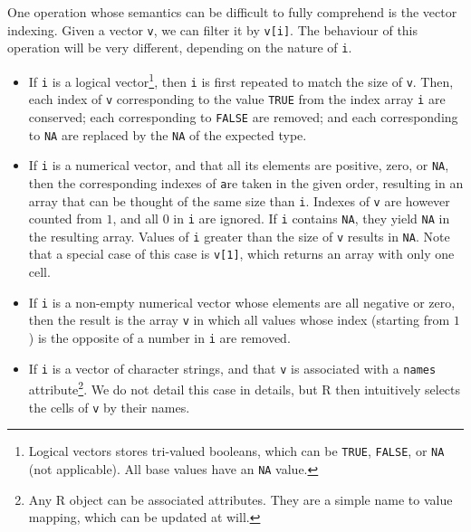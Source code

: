 \documentclass{article}
\newcommand\R{R}
\begin{document}
One operation whose semantics can be difficult
to fully comprehend is the vector indexing.
Given a vector \texttt{v},
we can filter it by \texttt{v[i]}.
The behaviour of this operation will be very different,
depending on the nature of \texttt{i}.
\begin{itemize}
    \item If \texttt{i} is a logical vector\footnote{
          Logical vectors stores tri-valued booleans,
          which can be \texttt{TRUE}, \texttt{FALSE},
          or \texttt{NA} (not applicable).
          All base values have an \texttt{NA} value.
      }, then \texttt{i} is first repeated
      to match the size of \texttt{v}.
      Then, each index of \texttt{v} corresponding
      to the value \texttt{TRUE} from the index array \texttt{i}
      are conserved;
      each corresponding to \texttt{FALSE} are removed;
      and each corresponding to \texttt{NA} are replaced
      by the \texttt{NA} of the expected type.
    \item If \texttt{i} is a numerical vector,
      and that all its elements are positive, zero, or \texttt{NA},
      then the corresponding indexes of \texttt
      are taken in the given order, resulting in an array
      that can be thought of the same size than \texttt{i}.
      Indexes of \texttt{v} are however counted from
      \(1\), and all \(0\) in \texttt{i} are ignored.
      If \texttt{i} contains \texttt{NA},
      they yield \texttt{NA} in the resulting array.
      Values of \texttt{i} greater than the size of \texttt{v}
      results in \texttt{NA}.
      Note that a special case of this case is \texttt{v[1]},
      which returns an array with only one cell.
    \item If \texttt{i} is a non-empty numerical vector
      whose elements are all negative or zero,
      then the result is the array \texttt{v}
      in which all values whose index (starting from \(1\))
      is the opposite of a number in \texttt{i} are removed.
    \item If \texttt{i} is a vector of character strings,
      and that \texttt{v} is associated with a \texttt{names}
      attribute\footnote{
          Any \R{} object can be associated attributes.
          They are a simple name to value mapping,
          which can be updated at will.
      }.
      We do not detail this case in details,
      but \R{} then intuitively selects the cells of \texttt{v}
      by their names.
\end{itemize}
\end{document}
